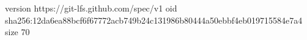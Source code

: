 version https://git-lfs.github.com/spec/v1
oid sha256:12da6ea88bcf6f67772acb749b24c131986b80444a50ebbf4eb019715584e7a4
size 70

